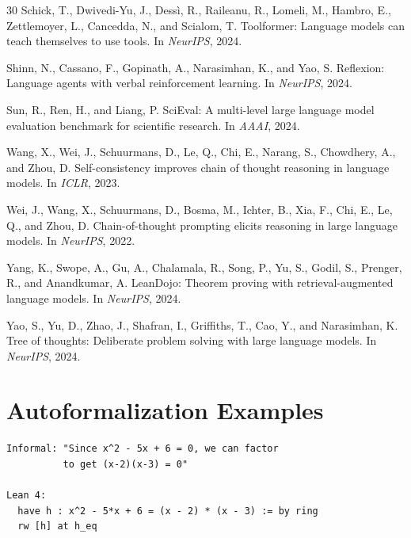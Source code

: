 \documentclass[11pt,a4paper]{article}
\begin{document}
\begin{thebibliography}{30}
Schick, T., Dwivedi-Yu, J., Dess{\`i}, R., Raileanu, R., Lomeli, M., Hambro, E., Zettlemoyer, L., Cancedda, N., and Scialom, T.
\newblock Toolformer: Language models can teach themselves to use tools.
\newblock In \emph{NeurIPS}, 2024.

Shinn, N., Cassano, F., Gopinath, A., Narasimhan, K., and Yao, S.
\newblock Reflexion: Language agents with verbal reinforcement learning.
\newblock In \emph{NeurIPS}, 2024.

Sun, R., Ren, H., and Liang, P.
\newblock SciEval: A multi-level large language model evaluation benchmark for scientific research.
\newblock In \emph{AAAI}, 2024.

Wang, X., Wei, J., Schuurmans, D., Le, Q., Chi, E., Narang, S., Chowdhery, A., and Zhou, D.
\newblock Self-consistency improves chain of thought reasoning in language models.
\newblock In \emph{ICLR}, 2023.

Wei, J., Wang, X., Schuurmans, D., Bosma, M., Ichter, B., Xia, F., Chi, E., Le, Q., and Zhou, D.
\newblock Chain-of-thought prompting elicits reasoning in large language models.
\newblock In \emph{NeurIPS}, 2022.

Yang, K., Swope, A., Gu, A., Chalamala, R., Song, P., Yu, S., Godil, S., Prenger, R., and Anandkumar, A.
\newblock LeanDojo: Theorem proving with retrieval-augmented language models.
\newblock In \emph{NeurIPS}, 2024.

Yao, S., Yu, D., Zhao, J., Shafran, I., Griffiths, T., Cao, Y., and Narasimhan, K.
\newblock Tree of thoughts: Deliberate problem solving with large language models.
\newblock In \emph{NeurIPS}, 2024.

\end{thebibliography}

\appendix

\section{Autoformalization Examples}
\label{app:autoformalization}

\begin{lstlisting}[caption={Example: informal step to Lean 4 tactic},language={}]
Informal: "Since x^2 - 5x + 6 = 0, we can factor
          to get (x-2)(x-3) = 0"

Lean 4:
  have h : x^2 - 5*x + 6 = (x - 2) * (x - 3) := by ring
  rw [h] at h_eq
\end{lstlisting}
\end{document}
